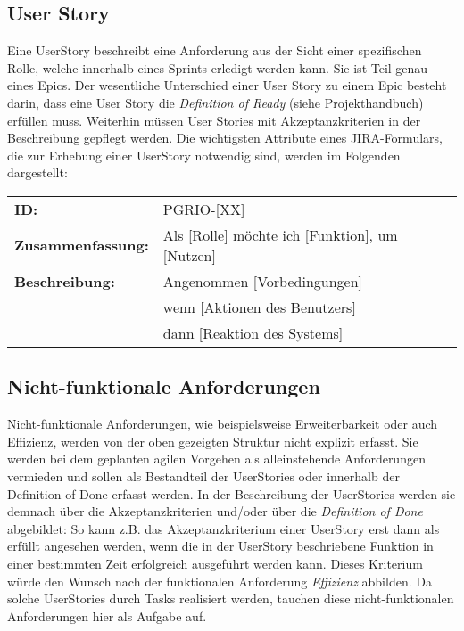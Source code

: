 \subsection{User Story}\label{ADUserStory}
Eine UserStory beschreibt eine Anforderung aus der Sicht einer spezifischen Rolle, welche innerhalb eines Sprints erledigt werden kann. Sie ist Teil genau eines Epics. Der wesentliche Unterschied einer User Story zu einem Epic besteht darin, dass eine User Story die \textit{Definition of Ready} (siehe Projekthandbuch) erfüllen muss. Weiterhin müssen User Stories mit Akzeptanzkriterien in der Beschreibung gepflegt werden. Die wichtigsten Attribute eines JIRA-Formulars, die zur Erhebung einer UserStory notwendig sind, werden im Folgenden dargestellt:

\begin{flushleft}
\begin{tabular}{ll}
\textbf{ID:} & PGRIO-[XX]\\
\textbf{Zusammenfassung:} & Als [Rolle] möchte ich [Funktion], um [Nutzen]\\
\textbf{Beschreibung:} & Angenommen [Vorbedingungen] \\
& wenn [Aktionen des Benutzers] \\
& dann [Reaktion des Systems]\\
\end{tabular}
\end{flushleft}

\subsection{Nicht-funktionale Anforderungen}\label{ADNFAnforderugen}
Nicht-funktionale Anforderungen, wie beispielsweise Erweiterbarkeit oder auch Effizienz, werden von der oben gezeigten Struktur nicht explizit erfasst. Sie werden bei dem geplanten agilen Vorgehen als alleinstehende Anforderungen vermieden und sollen als Bestandteil der UserStories oder innerhalb der Definition of Done erfasst werden. In der Beschreibung der UserStories werden sie demnach über die Akzeptanzkriterien und/oder über die \textit{Definition of Done} abgebildet: So kann z.B. das Akzeptanzkriterium einer UserStory erst dann als erfüllt angesehen werden, wenn die in der UserStory beschriebene Funktion in einer bestimmten Zeit erfolgreich ausgeführt werden kann. Dieses Kriterium würde den Wunsch nach der funktionalen Anforderung \textit{Effizienz} abbilden. Da solche  UserStories durch Tasks realisiert werden, tauchen diese nicht-funktionalen Anforderungen hier als Aufgabe auf.


